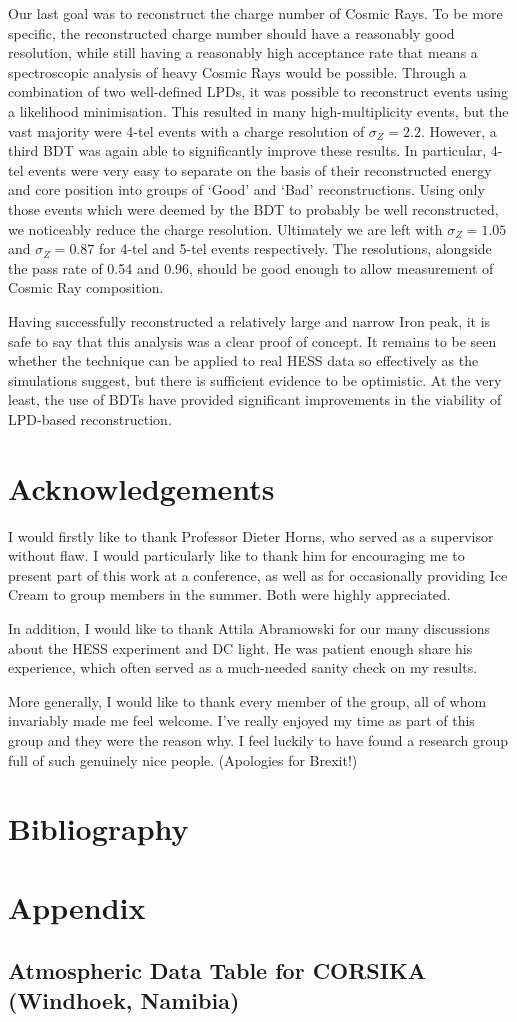 \documentclass[11pt]{article}
\begin{document}
Our last goal was to reconstruct the charge number of Cosmic Rays. To be more specific, the reconstructed charge number should have a reasonably good resolution, while still having a reasonably high acceptance rate that means a spectroscopic analysis of heavy Cosmic Rays would be possible. Through a combination of two well-defined LPDs, it was possible to reconstruct events using a likelihood minimisation. This resulted in many high-multiplicity events, but the vast majority were 4-tel events with a charge resolution of $\sigma_{Z} = 2.2$. However, a third BDT was again able to significantly improve these results. In particular, 4-tel events were very easy to separate on the basis of their reconstructed energy and core position into groups of \textquoteleft Good' and \textquoteleft Bad' reconstructions. Using only those events which were deemed by the BDT to probably be well reconstructed, we noticeably reduce the charge resolution. Ultimately we are left with $\sigma_{Z}=1.05$ and $\sigma_{Z}=0.87$ for 4-tel and 5-tel events respectively. The resolutions, alongside the pass rate of 0.54 and 0.96, should be good enough to allow measurement of Cosmic Ray composition.

Having successfully reconstructed a relatively large and narrow Iron peak, it is safe to say that this analysis was a clear proof of concept. It remains to be seen whether the technique can be applied to real HESS data so effectively as the simulations suggest, but there is sufficient evidence to be optimistic. At the very least, the use of BDTs have provided significant improvements in the viability of LPD-based reconstruction.
\newpage
\section{Acknowledgements}
I would firstly like to thank Professor Dieter Horns, who served as a supervisor without flaw. I would particularly like to thank him for encouraging  me to present part of this work at a conference, as well as for occasionally providing Ice Cream to group members in the summer. Both were highly appreciated. 

In addition, I would like to thank Attila Abramowski for our many discussions about the HESS experiment and DC light. He was patient enough share his experience, which often served as a much-needed sanity check on my results. 

More generally, I would like to thank every member of the group, all of whom invariably made me feel welcome. I've really enjoyed my time as part of this group and they were the reason why. I feel luckily to have found a research group full of such genuinely nice people. (Apologies for Brexit!)
\newpage
\section{Bibliography}


\section{Appendix}
\subsection{Atmospheric Data Table for CORSIKA (Windhoek, Namibia)}
\begin{center}
\begin{small}
\end{small}
\end{center}
\end{document}
